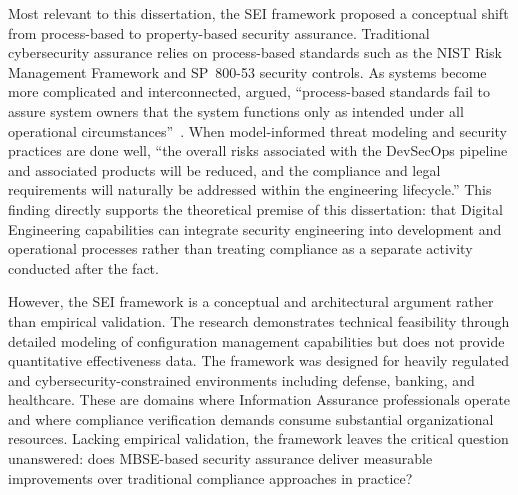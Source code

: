 Most relevant to this dissertation, the SEI framework proposed a conceptual shift from process-based to property-based security assurance. Traditional cybersecurity assurance relies on process-based standards such as the NIST Risk Management Framework and SP~800-53 security controls. As systems become more complicated and interconnected, \citeauthor{CMU_SEI_DevSecOps_2023} argued, ``process-based standards fail to assure system owners that the system functions only as intended under all operational circumstances''~\parencite{CMU_SEI_DevSecOps_2023}. When model-informed threat modeling and security practices are done well, ``the overall risks associated with the DevSecOps pipeline and associated products will be reduced, and the compliance and legal requirements will naturally be addressed within the engineering lifecycle.''
This finding directly supports the theoretical premise of this dissertation: that Digital Engineering capabilities can integrate security engineering into development and operational processes rather than treating compliance as a separate activity conducted after the fact.

However, the SEI framework is a conceptual and architectural argument rather than empirical validation. The research demonstrates technical feasibility through detailed modeling of configuration management capabilities but does not provide quantitative effectiveness data. The framework was designed for heavily regulated and cybersecurity-constrained environments including defense, banking, and healthcare. These are domains where Information Assurance professionals operate and where compliance verification demands consume substantial organizational resources. Lacking empirical validation, the framework leaves the critical question unanswered: does MBSE-based security assurance deliver measurable improvements over traditional compliance approaches in practice?

